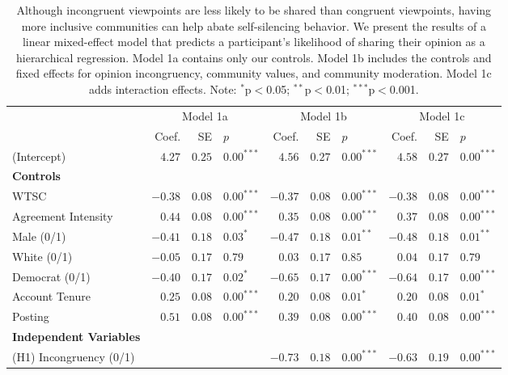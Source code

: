 \begin{table*}[t!]
    \footnotesize
    \centering
    \caption{Although incongruent viewpoints are less likely to be shared than congruent viewpoints, having more inclusive communities can help abate self-silencing behavior. We present the results of a linear mixed-effect model that predicts a participant's likelihood of sharing their opinion as a hierarchical regression. Model 1a contains only our controls. Model 1b includes the controls and fixed effects for opinion incongruency, community values, and community moderation. Model 1c adds interaction effects. Note: $^{*}$p$<$0.05; $^{**}$p$<$0.01; $^{***}$p$<$0.001.}
    \begin{tabular}{lrrlrrlrrl}
    \toprule
         & \multicolumn{3}{c}{Model 1a} &  \multicolumn{3}{c}{Model 1b} &  \multicolumn{3}{c}{Model 1c}\\
    \cmidrule(lr){2-4}\cmidrule(lr){5-7}\cmidrule(lr){8-10}
     & Coef. & SE & $p$ & Coef. & SE & $p$ & Coef. & SE & $p$\\ \midrule
    (Intercept) & $4.27$ & $0.25$ & $0.00^{***}$ & $4.56$ & $0.27$ & $0.00^{***}$ & $4.58$ & $0.27$ & $0.00^{***}$\\
    \textbf{Controls} \\
    WTSC & $-0.38$ & $0.08$ & $0.00^{***}$ &$-0.37$ &$0.08$ &$0.00^{***}$ &$-0.38$ & $0.08$ & $0.00^{***}$\\ 
    Agreement Intensity & $0.44$ & $0.08$ & $0.00^{***}$ & $0.35$ & $0.08$ & $0.00^{***}$ & $0.37$ & $0.08$ & $0.00^{***}$\\
    Male (0/1) & $-0.41$ & $0.18$ & $0.03^{*}$ & $-0.47$ & $0.18$ & $0.01^{**}$ & $-0.48$ & $0.18$ & $0.01^{**}$\\
    White (0/1) & $-0.05$ & $0.17$ &$0.79$ & $0.03$ & $0.17$ & $0.85$ & $0.04$ & $0.17$ & $0.79$\\ 
    Democrat (0/1) & $-0.40$ & $0.17$ &$0.02^{*}$ & $-0.65$ & $0.17$ & $0.00^{***}$ & $-0.64$ & $0.17$ & $0.00^{***}$\\
    Account Tenure & $0.25$ & $0.08$ & $0.00^{***}$ & $0.20$ & $0.08$ & $0.01^{*}$ & $0.20$ & $0.08$ & $0.01^{*}$\\
    Posting & $0.51$ & $0.08$ & $0.00^{***}$& $0.39$ & $0.08$ & $0.00^{***}$ & $0.40$ & $0.08$ & $0.00^{***}$\\ \addlinespace
    \textbf{Independent Variables} \\
    (H1) Incongruency (0/1) & & & & $-0.73$ & $0.18$ & $0.00^{***}$ & $-0.63$ & $0.19$& $0.00^{***}$\\

\end{tabular}
\end{table*}
